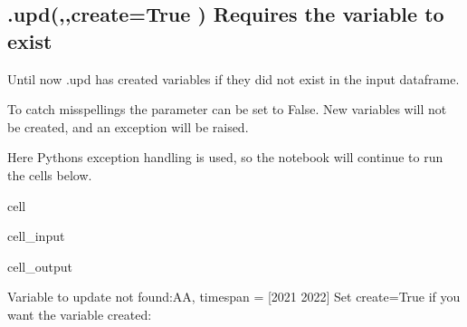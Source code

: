 \documentclass[letterpaper,10pt,english]{jupyterBook}
\begin{document}
\subsection{.upd(,,create=True ) Requires the variable to exist}
\label{\detokenize{content/04_PythonEssentials/UpdateCommand:upd-create-true-requires-the-variable-to-exist}}
\sphinxAtStartPar
Until now .upd has created variables if they did not exist in the input dataframe.

\sphinxAtStartPar
To catch misspellings the parameter  can be set to False.
New variables will not be created, and an exception will be raised.

\sphinxAtStartPar
Here Pythons exception handling is used, so the notebook will continue to run the cells below.

\begin{sphinxuseclass}{cell}\begin{sphinxVerbatimInput}

\begin{sphinxuseclass}{cell_input}
\begin{sphinxVerbatim}[commandchars=\\\{\}]
      
   
      
\end{sphinxVerbatim}

\end{sphinxuseclass}\end{sphinxVerbatimInput}
\begin{sphinxVerbatimOutput}

\begin{sphinxuseclass}{cell_output}
\begin{sphinxVerbatim}[commandchars=\\\{\}]
Variable to update not found:AA, timespan = [2021 2022] 
Set create=True if you want the variable created: 
\end{sphinxVerbatim}

\end{sphinxuseclass}\end{sphinxVerbatimOutput}

\end{sphinxuseclass}
\sphinxstepscope
\end{document}
